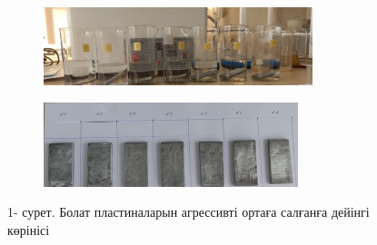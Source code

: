 \begin{figure}[H]
    \centering
    \begin{subfigure}{0.6\textwidth}
        \centering
        \includegraphics[width=\textwidth]{media/gor/image22}
    \end{subfigure}
    \begin{subfigure}{0.6\textwidth}
        \centering
        \includegraphics[width=\textwidth]{media/gor/image23}
    \end{subfigure}
    \caption*{1- сурет. Болат пластиналарын агрессивті ортаға салғанға дейінгі көрінісі}
\end{figure}






